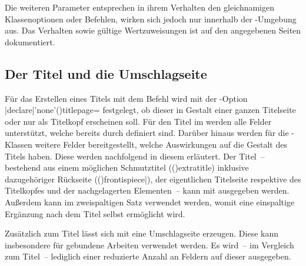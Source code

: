 \begin{DeclareEntity*}{}
\begin{DeclareEntity*}{}
\begin{DeclareEntity*}{}
\begin{Declaration}
\begin{Declaration}
\begin{Declaration}
\begin{Declaration}
\begin{Declaration}
\begin{Declaration}
\begin{Declaration}
\begin{Declaration}
\begin{Declaration}
\begin{Declaration}
\begin{Declaration}
\begin{Declaration}
Die weiteren Parameter entsprechen in ihrem Verhalten den gleichnamigen 
Klassenoptionen oder Befehlen, wirken sich jedoch nur innerhalb der 
-Umgebung aus. Das Verhalten sowie gültige 
Wertzuweisungen ist auf den angegebenen Seiten dokumentiert.
\end{Declaration}
\end{Declaration}
\end{Declaration}
\end{Declaration}
\end{Declaration}
\end{Declaration}
\end{Declaration}
\end{Declaration}
\end{Declaration}
\end{Declaration}
\end{Declaration}
\end{Declaration}
%



\subsection{%
  Der Titel und die Umschlagseite%
  \label{sec:title}%
}

%
Für das Erstellen eines Titels mit dem Befehl  wird mit der 
\KOMAScript-Option 
\Option|declare|'none'(){titlepage=\PBoolean} 
festgelegt, ob dieser in Gestalt einer ganzen Titelseite oder nur als Titelkopf 
erscheinen soll. Für den Titel im \TUDCD werden alle Felder unterstützt, welche 
bereits durch \KOMAScript{} definiert sind. Darüber hinaus werden für die 
\TUDScript-Klassen weitere Felder bereitgestellt, welche Auswirkungen auf die 
Gestalt des Titels haben. Diese werden nachfolgend in diesem \autorefname 
erläutert. Der Titel~-- bestehend aus einem möglichen Schmutztitel 
(\Macro(){extratitle}) inklusive dazugehöriger Rückseite 
(\Macro(){frontispiece|}), der 
eigentlichen Titelseite respektive des Titelkopfes und der nachgelagerten 
Elementen~-- kann mit  ausgegeben werden. Außerdem kann im 
zweispaltigen Satz  verwendet werden, womit eine 
einspaltige Ergänzung nach dem Titel selbst ermöglicht wird.

Zusätzlich zum Titel lässt sich mit  eine Umschlagseite 
erzeugen. Diese kann insbesondere für gebundene Arbeiten verwendet werden. Es 
wird~-- im Vergleich zum Titel~-- lediglich einer reduzierte Anzahl an Feldern 
auf dieser ausgegeben.


\end{DeclareEntity*}
\end{DeclareEntity*}
\end{DeclareEntity*}
